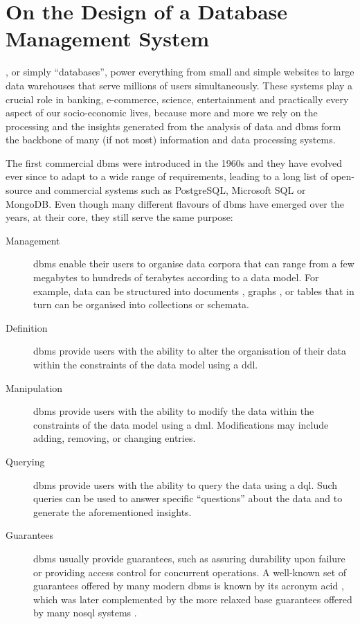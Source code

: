\chapter{On the Design of a Database Management System}
\label{chapter:theory_databases}


, or simply ``databases'', power everything from small and simple websites to large data warehouses that serve millions of users simultaneously. These systems play a crucial role in banking, e-commerce, science, entertainment and practically every aspect of our socio-economic lives, because more and more we rely on the processing and the insights generated from the analysis of data \cite{Dhar:2013Data} and \acrshort{dbms} form the backbone of many (if not most) information and data processing systems.

The first commercial \acrshort{dbms} were introduced in the 1960s \cite{Garcia:2009Database} and they have evolved ever since to adapt to a wide range of requirements, leading to a long list of open-source and commercial systems such as PostgreSQL, Microsoft SQL or MongoDB. Even though many different flavours of \acrshort{dbms} have emerged over the years, at their core, they still serve the same purpose:

\begin{description}
    \item[Management] \acrshort{dbms} enable their users to organise data corpora that can range from a few megabytes to hundreds of terabytes according to a data model. For example, data can be structured into documents \cite{Hashem:2016Evaluating}, graphs \cite{Angles:2008Survey}, or tables \cite{Codd:1970Relational} that in turn can be organised into collections or schemata.
    \item[Definition] \acrshort{dbms} provide users with the ability to alter the organisation of their data within the constraints of the data model using a \acrfull{ddl}. 
    \item[Manipulation] \acrshort{dbms} provide users with the ability to modify the data within the constraints of the data model using a \acrfull{dml}. Modifications may include adding, removing, or changing entries.
    \item[Querying] \acrshort{dbms} provide users with the ability to query the data using a \acrfull{dql}. Such queries can be used to answer specific ``questions'' about the data and to generate the aforementioned insights.
    \item[Guarantees] \acrshort{dbms} usually provide guarantees, such as assuring durability upon failure or providing access control for concurrent operations. A well-known set of guarantees offered by many modern \acrshort{dbms} is known by its acronym \acrshort{acid} \cite{Haerder:1983principles}, which was later complemented by the more relaxed \acrshort{base} guarantees offered by many \acrshort{nosql} systems \cite{Pritchett:2008Base}.
\end{description}


